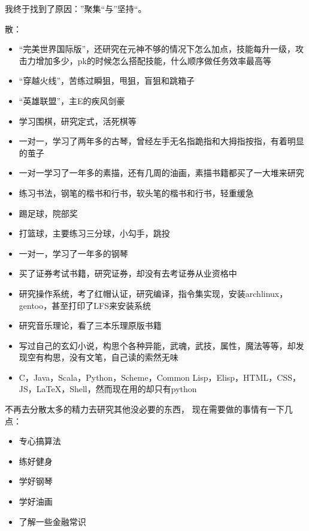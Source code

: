 我终于找到了原因：”聚集“与”坚持“。


散：
\begin{itemize}
\item “完美世界国际版”，还研究在元神不够的情况下怎么加点，技能每升一级，攻击力增加多少，pk的时候怎么搭配技能，什么顺序做任务效率最高等
\item “穿越火线”，苦练过瞬狙，甩狙，盲狙和跳箱子
\item “英雄联盟”，主E的疾风剑豪
\item 学习围棋，研究定式，活死棋等
\item 一对一，学习了两年多的古琴，曾经左手无名指跪指和大拇指按指，有着明显的茧子
\item 一对一学习了一年多的素描，还有几周的油画，素描书籍都买了一大堆来研究
\item 练习书法，钢笔的楷书和行书，软头笔的楷书和行书，轻重缓急
\item 踢足球，院部奖
\item 打篮球，主要练习三分球，小勾手，跳投
\item 一对一，学习了一年多的钢琴
\item 买了证券考试书籍，研究证券，却没有去考证券从业资格中
\item 研究操作系统，考了红帽认证，研究编译，指令集实现，安装archlinux，gentoo，甚至打印了LFS来安装系统
\item 研究音乐理论，看了三本乐理原版书籍
\item 写过自己的玄幻小说，构思个各种异能，武魂，武技，属性，魔法等等，却发现空有构思，没有文笔，自己读的索然无味
\item C，Java，Scala，Python，Scheme，Common Lisp，Elisp，HTML，CSS，JS，LaTeX，Shell，然而现在用的却只有python
\end{itemize}



不再去分散太多的精力去研究其他没必要的东西，
现在需要做的事情有一下几点：
\begin{itemize}
\item 专心搞算法
\item 练好健身
\item 学好钢琴
\item 学好油画
\item 了解一些金融常识
\end{itemize}























